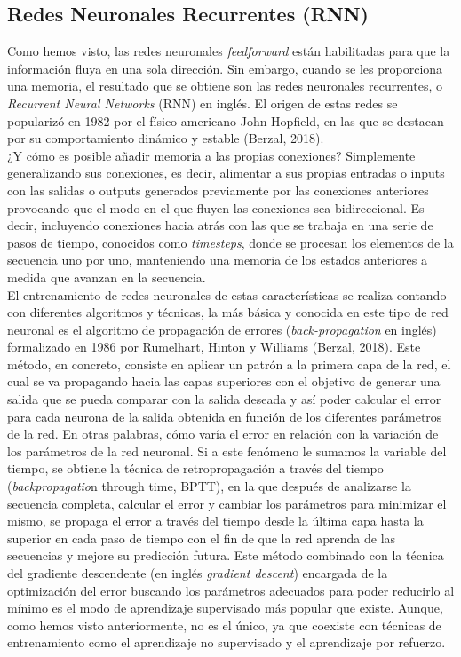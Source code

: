 \subsection{Redes Neuronales Recurrentes (RNN)} 

Como hemos visto, las redes neuronales \textit{feedforward} están habilitadas para que la información fluya en una sola dirección. Sin embargo, cuando se les proporciona una memoria, el resultado que se obtiene son las redes neuronales recurrentes, o \textit{Recurrent Neural Networks} (RNN) en inglés. El origen de estas redes se popularizó en 1982 por el físico americano John Hopfield, en las que se destacan por su comportamiento dinámico y estable (Berzal, 2018). \\

¿Y cómo es posible añadir memoria a las propias conexiones? Simplemente generalizando sus conexiones, es decir, alimentar a sus propias entradas o inputs con las salidas o outputs generados previamente por las conexiones anteriores provocando que el modo en el que fluyen las conexiones sea bidireccional. Es decir, incluyendo conexiones hacia atrás con las que se trabaja en una serie de pasos de tiempo, conocidos como \textit{timesteps}, donde se procesan los elementos de la secuencia uno por uno, manteniendo una memoria de los estados anteriores a medida que avanzan en la secuencia.\\

El entrenamiento de redes neuronales de estas características se realiza contando con diferentes algoritmos y técnicas, la más básica y conocida en este tipo de red neuronal es el algoritmo de propagación de errores (\textit{back-propagation} en inglés) formalizado en 1986 por Rumelhart, Hinton y Williams (Berzal, 2018). Este método, en concreto, consiste en aplicar un patrón a la primera capa de la red, el cual se va propagando hacia las capas superiores con el objetivo de generar una salida que se pueda comparar con la salida deseada y así poder calcular el error para cada neurona de la salida obtenida en función de los diferentes parámetros de la red. En otras palabras, cómo varía el error en relación con la variación de los parámetros de la red neuronal. Si a este fenómeno le sumamos la variable del tiempo, se obtiene la técnica de retropropagación a través del tiempo (\textit{backpropagatio}n through time, BPTT), en la que después de analizarse la secuencia completa, calcular el error y cambiar los parámetros para minimizar el mismo, se propaga el error a través del tiempo desde la última capa hasta la superior en cada paso de tiempo con el fin de que la red aprenda de las secuencias y mejore su predicción futura. 
Este método combinado con la técnica del gradiente descendente (en inglés \textit{gradient descent}) encargada de la optimización del error buscando los parámetros adecuados para poder reducirlo al mínimo es el modo de aprendizaje supervisado más popular que existe.  Aunque, como hemos visto anteriormente, no es el único, ya que coexiste con técnicas de entrenamiento como el aprendizaje no supervisado y el aprendizaje por refuerzo. \\

